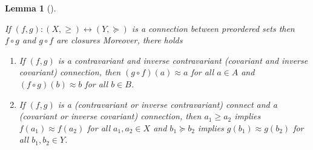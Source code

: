 \documentclass[
  letterpaper,
  10pt,
  reqno,
  twopage,
  openany]{book}
\providecommand{\tightlist}{%
  \setlength{\itemsep}{0pt}\setlength{\parskip}{0pt}}\usepackage{longtable,booktabs,array}
\theoremstyle{plain}
\newtheorem{lemma}{Lemma}[chapter]
\theoremstyle{definition}
\theoremstyle{definition}
\theoremstyle{definition}
\theoremstyle{plain}
\theoremstyle{plain}
\theoremstyle{remark}
\begin{document}
\leavevmode{}%
\begin{lemma}[]\label{lem-contrandcov}

If \({(f,g):(X,\geq) \leftrightarrow (Y,\succeq)}\) is a connection
between preordered sets then \(f\circ g\) and \(g\circ f\) are closures
Moreover, there holds

\begin{enumerate}
\def\labelenumi{\arabic{enumi}.}
\tightlist
\item
  If \((f,g)\) is a contravariant and inverse contravariant (covariant
  and inverse covariant) connection, then \((g\circ f)(a)\approx a\) for
  all \(a\in A\) and \((f\circ g)(b)\approx b\) for all \(b\in B\).
\item
  If \((f,g)\) is a (contravariant or inverse contravariant) connect and
  a (covariant or inverse covariant) connection, then \(a_1\geq a_2\)
  implies \(f(a_1)\approx f(a_2)\) for all \(a_1,a_2\in X\) and
  \(b_1\succeq b_2\) implies \(g(b_1)\approx g(b_2)\) for all
  \(b_1,b_2\in Y\).
\end{enumerate}

\end{lemma}
\end{document}

